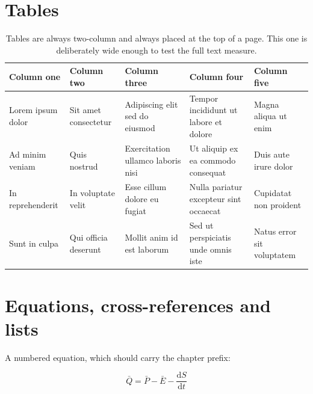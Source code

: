 \lipsum[11-15]

\section{Tables}

\lipsum[11-15]

\begin{table}[t!]
\caption{Tables are always two-column and always placed at the top of a page.
This one is deliberately wide enough to test the full text measure.}
\label{tab:mock-preface}
\sffamily\scriptsize
\begin{tabular}{p{} p{} p{} p{} p{}}
\toprule
\textbf{Column one} & \textbf{Column two} & \textbf{Column three} &
\textbf{Column four} & \textbf{Column five} \\
\midrule
Lorem ipsum dolor & Sit amet consectetur & Adipiscing elit sed do eiusmod &
Tempor incididunt ut labore et dolore & Magna aliqua ut enim \\
\addlinespace
Ad minim veniam & Quis nostrud & Exercitation ullamco laboris nisi &
Ut aliquip ex ea commodo consequat & Duis aute irure dolor \\
\addlinespace
In reprehenderit & In voluptate velit & Esse cillum dolore eu fugiat &
Nulla pariatur excepteur sint occaecat & Cupidatat non proident \\
\addlinespace
Sunt in culpa & Qui officia deserunt & Mollit anim id est laborum &
Sed ut perspiciatis unde omnis iste & Natus error sit voluptatem \\
\bottomrule
\end{tabular}
\end{table}

\lipsum[14-16]

\section{Equations, cross-references and lists}

\lipsum[17]

A numbered equation, which should carry the chapter prefix:

\begin{equation}
\bar{Q} = \bar{P} - \bar{E} - \frac{\mathrm{d}S}{\mathrm{d}t}
\label{eq:mock-balance}
\end{equation}

